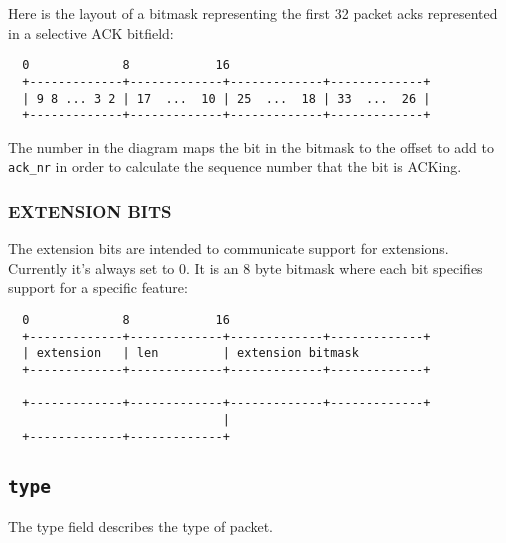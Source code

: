 \documentclass[11pt,a4paper,oneside,draft]{article}
\begin{document}
Here is the layout of a bitmask representing the first 32 packet acks represented in a selective ACK bitfield:
{\begin{verbatim}
  0             8            16
  +-------------+-------------+-------------+-------------+
  | 9 8 ... 3 2 | 17  ...  10 | 25  ...  18 | 33  ...  26 |
  +-------------+-------------+-------------+-------------+
\end{verbatim}}

The number in the diagram maps the bit in the bitmask to the offset to add to {\tt ack\_nr} in order to calculate the sequence number that the bit is ACKing.

{\subsubsection {EXTENSION BITS}}

The extension bits are intended to communicate support for extensions. Currently it's always set to 0. It is an 8 byte bitmask where each bit specifies support for a specific feature:

{\begin{verbatim}
  0             8            16
  +-------------+-------------+-------------+-------------+
  | extension   | len         | extension bitmask
  +-------------+-------------+-------------+-------------+
  
  +-------------+-------------+-------------+-------------+
                              |
  +-------------+-------------+
\end{verbatim}}

{\subsection {\tt type}}

The type field describes the type of packet.
\end{document}
